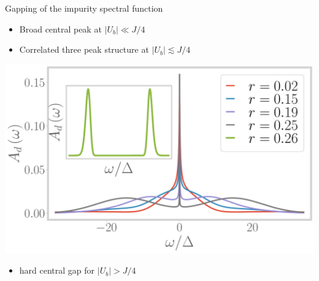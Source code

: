 \documentclass[8pt,aspectratio=169]{beamer}
\newcommand{\nitem}{\item[\ding{51}]}
\begin{document}
\begin{frame}{Gapping of the impurity spectral function}
\begin{minipage}{0.25\textwidth}
\begin{itemize}
\nitem Broad central peak at \(|U_b| \ll J/4\)
\end{itemize}
\end{minipage}
\hspace{\fill}
\begin{minipage}{0.45\textwidth}
\begin{itemize}
\nitem Correlated \alert{three peak} structure at \(|U_b| \lesssim J/4\)\\[10pt]
\end{itemize}
\includegraphics[width=\textwidth]{Add.pdf}
\end{minipage}
\hspace{\fill}
\begin{minipage}{0.25\textwidth}
\begin{itemize}
\nitem hard central \alert{gap} for  \(|U_b| > J/4\)
\end{itemize}
\end{minipage}

\end{frame}
\end{document}
